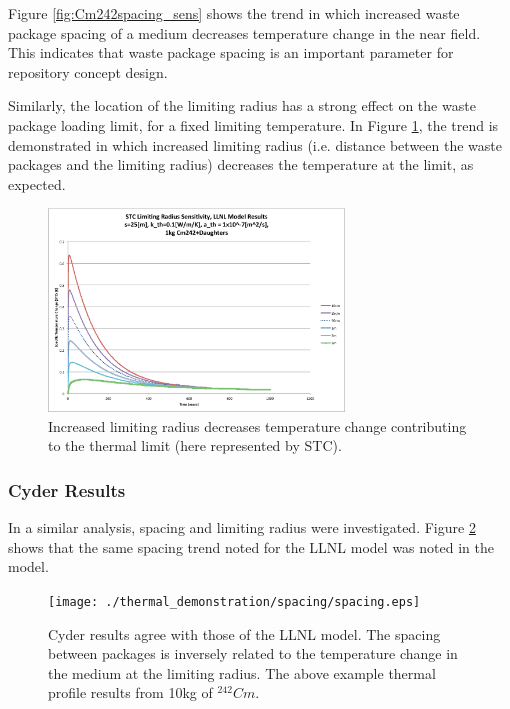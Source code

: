 Figure \ref{fig:Cm242spacing_sens} shows the trend in which increased waste 
package spacing of a medium decreases temperature change in the near field. This 
indicates that waste package spacing is an important parameter for repository 
concept design.  

Similarly, the location of the limiting radius has a strong effect on the 
waste package loading limit, for a fixed limiting temperature. In Figure 
\ref{fig:Cm242r_lim_sens}, the trend is demonstrated in which increased limiting 
radius (i.e. distance between the waste packages and the limiting radius) 
decreases the temperature at the limit, as expected.


\begin{figure}[htbp!]
\begin{center}
\includegraphics[width=0.7\textwidth]{./chapters/demonstration/spacing/Cm242r_lim_sens.eps}
\end{center}
\caption[Thermal Sensitivity to $r_{lim}$ and $s$]{Increased limiting radius 
decreases temperature change contributing to the thermal limit
(here represented by \gls{STC}).}
\label{fig:Cm242r_lim_sens}
\end{figure}


\FloatBarrier
\subsubsection{Cyder Results}


In a similar analysis, spacing and limiting radius were investigated. Figure 
\ref{fig:spacing_cyder} shows that the same spacing trend noted for the LLNL model was noted in the \Cyder model. 

\begin{figure}[htbp!]
\begin{center}
\texttt{[image: ./thermal\_demonstration/spacing/spacing.eps]}
\end{center}
\caption[Spacing Sensitivity in Cyder]
{Cyder results agree with those of the LLNL model. The spacing between packages 
is inversely related to the temperature change in the medium at the limiting 
radius. The above example thermal profile results from 10kg of $^{242}Cm$.}
\label{fig:spacing_cyder}
\end{figure}


